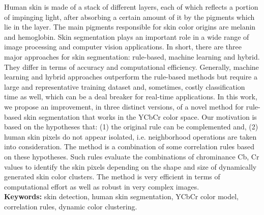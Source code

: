 \documentclass[12pt,twoside,a4paper]{book}
\theoremstyle{plain}
\theoremstyle{definition}
\begin{document}
Human skin is made of a stack of different layers, each of which reflects a portion of impinging light, after absorbing a certain amount of it by the pigments which lie in the layer. The main pigments responsible for skin color origins are melanin and hemoglobin. Skin segmentation plays an important role in a wide range of image processing and computer vision applications. In short, there are three major approaches for skin segmentation: rule-based, machine learning and hybrid. They differ in terms of accuracy and computational efficiency. Generally, machine learning and hybrid approaches outperform the rule-based methods but require a large and representative training dataset and, sometimes, costly classification time as well, which can be a deal breaker for real-time applications. In this work, we propose an improvement, in three distinct versions, of a novel method for rule-based skin segmentation that works in the YCbCr color space. Our motivation is based on the hypotheses that: (1) the original rule can be complemented and, (2) human skin pixels do not appear isolated, i.e. neighborhood operations are taken into consideration. The method is a combination of some correlation rules based on these hypotheses. Such rules evaluate the combinations of chrominance Cb, Cr values to identify the skin pixels depending on the shape and size of dynamically generated skin color clusters. The method is very efficient in terms of computational effort as well as robust in very complex images.
\\

\noindent \textbf{Keywords:} skin detection, human skin segmentation, YCbCr color model, correlation rules, dynamic color clustering.

\tableofcontents    %

\end{document}
